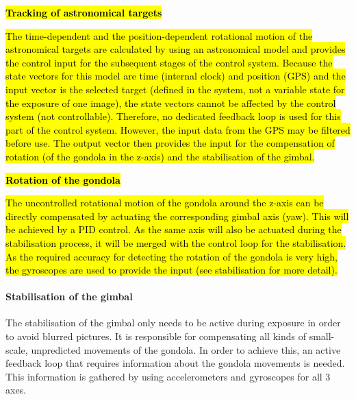 \textbf{\hl{Tracking of astronomical targets}}

\hl{The time-dependent and the position-dependent rotational motion of the astronomical targets are calculated by using an astronomical model and provides the control input for the subsequent stages of the control system. Because the state vectors for this model are time (internal clock) and position (GPS) and the input vector is the selected target (defined in the system, not a variable state for the exposure of one image), the state vectors cannot be affected by the control system (not controllable). Therefore, no dedicated feedback loop is used for this part of the control system. However, the input data from the GPS may be filtered before use. The output vector then provides the input for the compensation of rotation (of the gondola in the z-axis) and the stabilisation of the gimbal. }

\textbf{\hl{Rotation of the gondola}}

\hl{The uncontrolled rotational motion of the gondola around the z-axis can be directly compensated by actuating the corresponding gimbal axis (yaw). This will be achieved by a PID control. As the same axis will also be actuated during the stabilisation process, it will be merged with the control loop for the stabilisation. As the required accuracy for detecting the rotation of the gondola is very high, the gyroscopes are used to provide the input (see stabilisation for more detail).}


\paragraph{Stabilisation of the gimbal}
The stabilisation of the gimbal only needs to be active during exposure in order to avoid blurred pictures. It is responsible for compensating all kinds of small-scale, unpredicted movements of the gondola. In order to achieve this, an active feedback loop that requires information about the gondola movements is needed. This information is gathered by using accelerometers and gyroscopes for all 3 axes.

